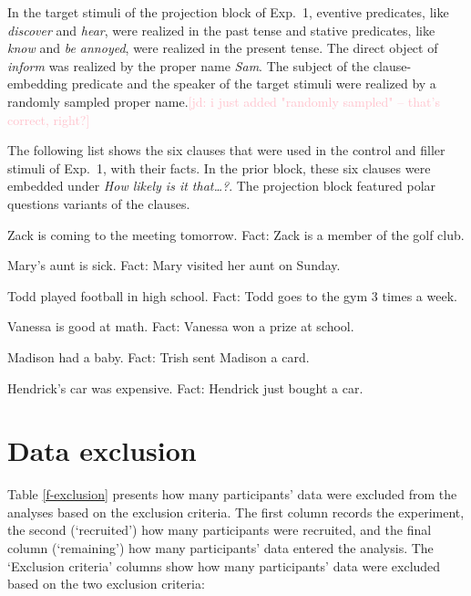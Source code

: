 \documentclass[11pt,fleqn]{article}
\newcommand{\jd}[1]{\textcolor{Pink}{[jd: #1]}}
\newcommand{\6}{\mbox{$[\hspace*{-.6mm}[$}}
\newcommand{\9}{\mbox{$]\hspace*{-.6mm}]$}}
\begin{document}
In the target stimuli of the projection block of Exp.~1, eventive predicates, like {\em discover} and {\em hear}, were realized in the past tense and stative predicates, like {\em know} and {\em be annoyed}, were realized in the present tense. The direct object of {\em inform} was realized by the proper name {\em Sam}. The subject of the clause-embedding predicate and the speaker of the target stimuli were realized by a randomly sampled proper name.\jd{i just added "randomly sampled" -- that's correct, right?} 

The following list shows the six clauses that were used in the control and filler stimuli of Exp.~1, with their facts. In the prior block, these six clauses were embedded under {\em How likely is it that\ldots?}. The projection block featured polar questions variants of the clauses.

\begin{enumerate}[leftmargin=3ex,itemsep=-2pt]
\ex Zack is coming to the meeting tomorrow. Fact: Zack is a member of the golf club. 

\ex Mary's aunt is sick. Fact: Mary visited her aunt on Sunday. 

\ex Todd played football in high school. Fact: Todd goes to the gym 3 times a week. 

\ex Vanessa is good at math. Fact: Vanessa won a prize at school. 

\ex Madison had a baby. Fact: Trish sent Madison a card. 

\ex Hendrick's car was expensive. Fact: Hendrick just bought a car. 
\end{enumerate}

\section{Data exclusion}\label{a-exclusion}

Table \ref{f-exclusion} presents how many participants' data were excluded from the analyses based on the exclusion criteria. The first column records the experiment, the second (`recruited') how many participants were recruited, and the final column (`remaining') how many participants' data entered the analysis. The `Exclusion criteria' columns show how many participants' data were excluded based on the two exclusion criteria: 
\end{document}
